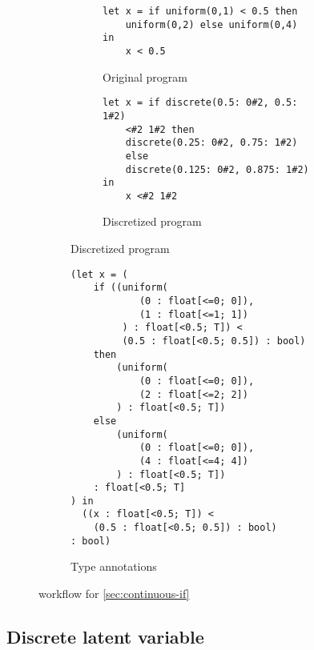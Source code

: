 \documentclass[acmsmall,screen,dvipsnames,x11names,nonacm,anonymous,review]{acmart}
\newcommand{\Slice}{\text{\scshape Slice}\xspace}
\begin{document}
\begin{figure}[ht]
\centering
\begin{subfigure}[t]{0.48\textwidth}  %
  \centering
  \begin{subfigure}[t]{\textwidth}
    \begin{lstlisting}
let x = if uniform(0,1) < 0.5 then 
    uniform(0,2) else uniform(0,4) in 
    x < 0.5
    \end{lstlisting}
    \caption{Original program}
    \label{fig:subA}
  \end{subfigure}

  \vspace{2em} %

  \begin{subfigure}[t]{\textwidth}
    \begin{lstlisting}
let x = if discrete(0.5: 0#2, 0.5: 1#2) 
    <#2 1#2 then 
    discrete(0.25: 0#2, 0.75: 1#2) 
    else
    discrete(0.125: 0#2, 0.875: 1#2) in
    x <#2 1#2
    \end{lstlisting}
    \caption{Discretized program}
    \label{fig:subC}
  \end{subfigure}
\end{subfigure}
\hfill
\begin{subfigure}[t]{0.48\textwidth}
\begin{lstlisting}
(let x = (
    if ((uniform(
            (0 : float[<=0; 0]), 
            (1 : float[<=1; 1])
         ) : float[<0.5; T]) < 
         (0.5 : float[<0.5; 0.5]) : bool) 
    then
        (uniform(
            (0 : float[<=0; 0]), 
            (2 : float[<=2; 2])
        ) : float[<0.5; T])
    else
        (uniform(
            (0 : float[<=0; 0]), 
            (4 : float[<=4; 4])
        ) : float[<0.5; T])
    : float[<0.5; T]
) in
  ((x : float[<0.5; T]) < 
    (0.5 : float[<0.5; 0.5]) : bool) 
: bool)
\end{lstlisting}

  \caption{Type annotations}
  \label{fig:subB}
\end{subfigure}

\caption{\Slice workflow for \ref{sec:continuous-if}}
\label{fig:main}
\end{figure}

\subsection{Discrete latent variable}
\label{sec:discrete-latent}
\end{document}
